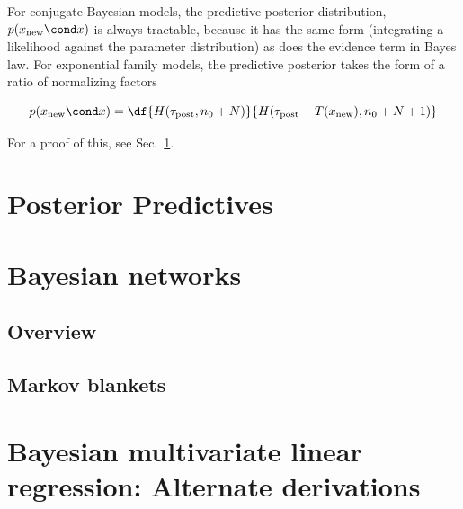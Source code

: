 \documentclass{article} %
\begin{document}
For conjugate Bayesian models, the predictive posterior distribution, $p(x_{\text{new}} \cond x)$ is always tractable, because it has the same form (integrating a likelihood against the parameter distribution) as does the evidence term in Bayes law.   For exponential family models, the predictive posterior takes the form of a ratio of normalizing factors

\begin{equation}
p(x_{\text{new}} \cond x) = \df{H(\tau_{\text{post}}, n_0 + N)}{H(\tau_{\text{post}} + T(x_{\text{new}}), n_0 + N + 1)}
\label{eqn:predictive_posterior_exptl_family}
\end{equation}

For a proof of this, see Sec.~\ref{sec:posterior_predictives}.


\section{Posterior Predictives} \label{sec:posterior_predictives}



\section{Bayesian networks} \label{sec:bayesian_networks}


\subsection{Overview}





\subsection{Markov blankets} \label{sec:markov_blankets}






\section{Bayesian multivariate linear regression: Alternate derivations}  \label{sec:more_bayesian_multivariate_linear_regression} 
\end{document}
